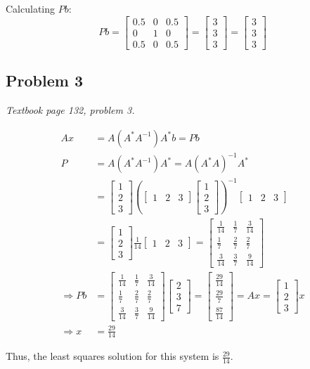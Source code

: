 \documentclass[11pt]{article}
\providecommand{\qbm}[1]{\begin{bmatrix} #1 \end{bmatrix}}
\begin{document}
Calculating $Pb$:
$$Pb = \begin{bmatrix}0.5&0&0.5\\0&1&0\\0.5&0&0.5\end{bmatrix} = \begin{bmatrix}3\\3\\3\end{bmatrix} = \begin{bmatrix}3\\3\\3\end{bmatrix} $$


\subsection*{Problem 3}
\textit{Textbook page 132, problem 3.}\newline


\begin{align*}
    Ax &= A(A^* A^{-1})A^* b = Pb \\
    P &= A(A^* A^{-1})A^* = A(A^* A)^{-1} A^* \\
    &= \qbm{1 \\ 2\\ 3} (\qbm{1 & 2 & 3}\qbm{1 \\ 2\\ 3})^{-1} \qbm{1 & 2 & 3} \\
    &= \qbm{1 \\ 2\\ 3} \frac{1}{14} \qbm{1 & 2 & 3} = \qbm{\frac{1}{14} & \frac{1}{7} & \frac{3}{14} \\
        \frac{1}{7} & \frac{2}{7} & \frac{2}{7} \\
        \frac{3}{14} &\frac{3}{7} &\frac{9}{14}} \\
    \Rightarrow Pb &= \qbm{\frac{1}{14} & \frac{1}{7} & \frac{3}{14} \\
        \frac{1}{7} & \frac{2}{7} & \frac{2}{7} \\
        \frac{3}{14} &\frac{3}{7} &\frac{9}{14}} \qbm{2 \\ 3 \\ 7} = \qbm{\frac{29}{14} \\ \frac{29}{7} \\ \frac{87}{14}} = Ax = \qbm{1 \\ 2\\ 3} x\\
    \Longrightarrow x &=  \frac{29}{14}
\end{align*}

Thus, the least squares solution for this system is $\frac{29}{14}$.
\end{document}
